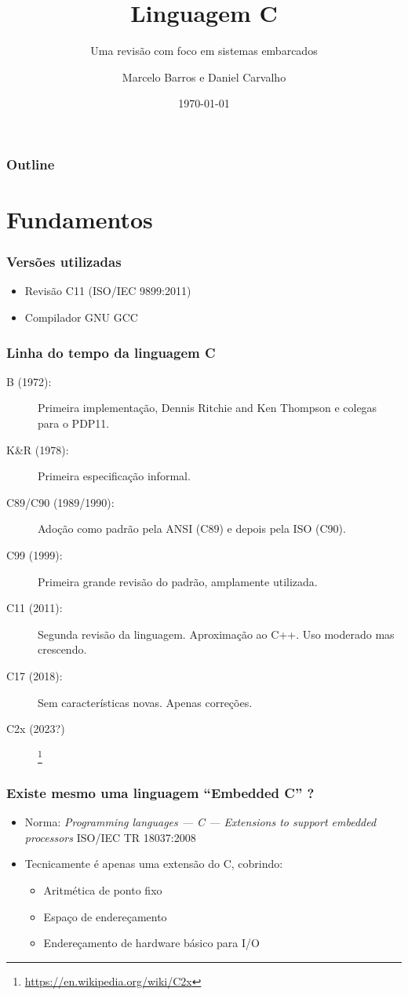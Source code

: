 \documentclass{beamer}
\title{Linguagem C}
\subtitle{Uma revisão com foco em sistemas embarcados}
\author{Marcelo Barros e Daniel Carvalho}
\institute{UFU/FEELT}
\date{\today}
\begin{document}
\begin{frame}
\titlepage
\end{frame}

\begin{frame}
\frametitle{Outline}
\tableofcontents
\end{frame}

\section{Fundamentos}

\begin{frame}
	\frametitle{Versões utilizadas}
	\begin{itemize}
		\item Revisão C11 (ISO/IEC 9899:2011)
		\item Compilador GNU GCC
	\end{itemize}
\end{frame}

\begin{frame}
	\frametitle{Linha do tempo da linguagem C}
	\begin{description}
		\item[ B (1972):] Primeira implementação, Dennis Ritchie and Ken Thompson e colegas para o PDP11.
		\item [K\&R (1978):] Primeira especificação informal.
		\item [C89/C90 (1989/1990):] Adoção como padrão pela ANSI (C89) e depois pela ISO (C90).
		\item [C99 (1999):] Primeira grande revisão do padrão, amplamente utilizada.
		\item [C11 (2011):] Segunda revisão da linguagem. Aproximação ao C++. Uso moderado mas crescendo.
		\item [C17 (2018):] Sem características novas. Apenas correções.
		\item [C2x (2023?)]\footnote{\url{https://en.wikipedia.org/wiki/C2x}}
	\end{description}
\end{frame}

\begin{frame}
	\frametitle{Existe mesmo uma linguagem ``Embedded C'' ?}
	\begin{itemize}
		\item Norma: \textit{Programming languages — C — Extensions to support embedded processors}
		ISO/IEC TR 18037:2008
		\item Tecnicamente é apenas uma extensão do C, cobrindo:
	\begin{itemize}
		\item Aritmética de ponto fixo
		\item Espaço de endereçamento
		\item Endereçamento de hardware básico para I/O
	\end{itemize}
	\end{itemize}
\end{frame}
\end{document}
